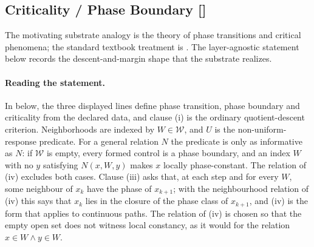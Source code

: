 \subsection{Criticality / Phase Boundary [\texorpdfstring{}{F44}]}\label{sec:self-reference-limits:criticality}

The motivating substrate analogy is the theory of phase transitions and
critical phenomena; the standard textbook treatment is
\citet{Stanley1971PhaseTransitions}.  The layer-agnostic statement
below records the descent-and-margin shape that the substrate
realizes.

\paragraph{Reading the statement.} In  below, the three
displayed lines define phase transition, phase boundary and criticality from
the declared data, and clause (i) is the ordinary quotient-descent criterion. Neighborhoods are indexed by \(W\in\mathcal W\), and \(U\) is the non-uniform-response
predicate. For a general relation \(N\) the predicate is only as informative
as \(N\): if \(\mathcal W\) is empty, every formed control is a phase boundary,
and an index \(W\) with no \(y\) satisfying \(N(x,W,y)\) makes \(x\) locally
phase-constant. The relation of (iv) excludes both cases. Clause (iii) asks that, at each step and for every \(W\), some
neighbour of \(x_k\) have the phase of \(x_{k+1}\); with the neighbourhood
relation of (iv) this says that \(x_k\) lies in the closure of the phase class
of \(x_{k+1}\), and (iv) is the form that applies to continuous paths.
The relation of (iv) is chosen so that the empty open set does not
witness local constancy, as it would for the relation
\(x\in W\wedge y\in W\).

